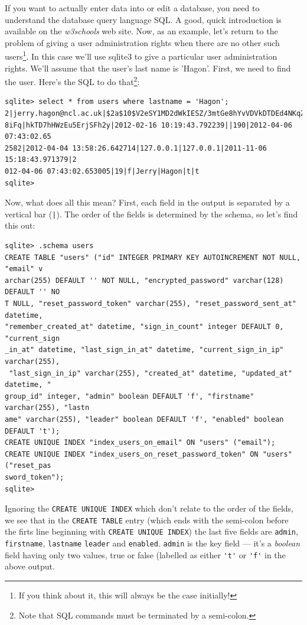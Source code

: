 \documentclass[12pt,twoside]{article}
\begin{document}
If you want to actually enter data into or edit a database, you need to 
understand the database query language SQL. A good, quick introduction is
available on the \emph{w3schools} web site\cite{w3schoolssql}.
Now, as an example, let's return to the problem of giving a user
administration rights when there are no other such users\footnote{If you think about it, this will always be the case initially!}.
In this case we'll use sqlite3 to give a particular user administration
rights. We'll assume that the user's last name is 'Hagon'. First, we need
to find the user. Here's the SQL to do that\footnote{Note that SQL
commands must be terminated by a semi-colon.}:

\small
\begin{verbatim}
sqlite> select * from users where lastname = 'Hagon';
2|jerry.hagon@ncl.ac.uk|$2a$10$V2eSY1MD2dWkIESZ/3mtGe8hYvVDVkDTDEd4NKqZOQJ3t9wg9
8iFq|hkTD7hHWzEu5ErjSFh2y|2012-02-16 10:19:43.792239||190|2012-04-06 07:43:02.65
2582|2012-04-04 13:58:26.642714|127.0.0.1|127.0.0.1|2011-11-06 15:18:43.971379|2
012-04-06 07:43:02.653005|19|f|Jerry|Hagon|t|t
sqlite> 
\end{verbatim}
\normalsize

Now, what does all this mean? First, each field in the output is separated
by a vertical bar (\verb=|=). The order of the fields is determined by the
schema, so let's find this out:

\small
\begin{verbatim}
sqlite> .schema users
CREATE TABLE "users" ("id" INTEGER PRIMARY KEY AUTOINCREMENT NOT NULL, "email" v
archar(255) DEFAULT '' NOT NULL, "encrypted_password" varchar(128) DEFAULT '' NO
T NULL, "reset_password_token" varchar(255), "reset_password_sent_at" datetime, 
"remember_created_at" datetime, "sign_in_count" integer DEFAULT 0, "current_sign
_in_at" datetime, "last_sign_in_at" datetime, "current_sign_in_ip" varchar(255),
 "last_sign_in_ip" varchar(255), "created_at" datetime, "updated_at" datetime, "
group_id" integer, "admin" boolean DEFAULT 'f', "firstname" varchar(255), "lastn
ame" varchar(255), "leader" boolean DEFAULT 'f', "enabled" boolean DEFAULT 't');
CREATE UNIQUE INDEX "index_users_on_email" ON "users" ("email");
CREATE UNIQUE INDEX "index_users_on_reset_password_token" ON "users" ("reset_pas
sword_token");
sqlite> 
\end{verbatim}
\normalsize

Ignoring the \verb=CREATE UNIQUE INDEX= which don't relate to the order of the
fields, we see that in the \verb=CREATE TABLE= entry (which ends with the
semi-colon before the firts line beginning with \verb=CREATE UNIQUE INDEX=)
the last five fields are \verb=admin=, \verb=firstname=, \verb=lastname=
\verb=leader= and \verb=enabled=. \verb=admin= is the key field --- it's
a \emph{boolean} field having only two values, true or false (labelled
as either \verb='t'= or \verb='f'= in the above output.
\end{document}
